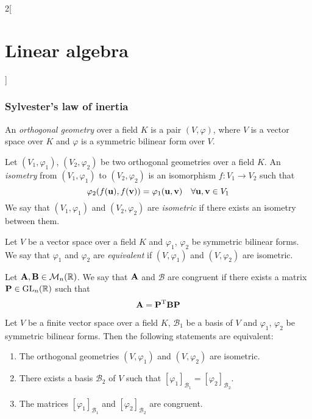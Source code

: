 \documentclass[../../../main_math.tex]{subfiles}
\begin{document}
\begin{multicols}{2}[\section{Linear algebra}]
  \subsubsection{Sylvester's law of inertia}
  \begin{definition}
    An \emph{orthogonal geometry} over a field $K$ is a pair $(V,\varphi)$, where $V$ is a vector space over $K$ and $\varphi$ is a symmetric bilinear form over $V$.
  \end{definition}
  \begin{definition}\label{LA:isometry}
    Let $(V_1,\varphi_1)$, $(V_2,\varphi_2)$ be two orthogonal geometries over a field $K$. An \emph{isometry} from $(V_1,\varphi_1)$ to $(V_2,\varphi_2)$ is an isomorphism $f:V_1\rightarrow V_2$ such that $$\varphi_2(f(\boldsymbol{\mathrm{u}}),f(\boldsymbol{\mathrm{v}}))=\varphi_1(\boldsymbol{\mathrm{u}},\boldsymbol{\mathrm{v}})\quad\forall\boldsymbol{\mathrm{u}},\boldsymbol{\mathrm{v}}\in V_1$$ We say that $(V_1,\varphi_1)$ and $(V_2,\varphi_2)$ are \emph{isometric} if there exists an isometry between them.
  \end{definition}
  \begin{definition}
    Let $V$ be a vector space over a field $K$ and $\varphi_1$, $\varphi_2$ be symmetric bilinear forms. We say that $\varphi_1$ and $\varphi_2$ are \emph{equivalent} if $(V,\varphi_1)$ and $(V,\varphi_2)$ are isometric.
  \end{definition}
  \begin{definition}
    Let $\boldsymbol{\mathrm{A}},\boldsymbol{\mathrm{B}}\in\mathcal{M}_n(\mathbb{R})$. We say that $\boldsymbol{\mathrm{A}}$ and $\mathcal{B}$ are congruent if there exists a matrix $\boldsymbol{\mathrm{P}}\in\mathrm{GL}_n(\mathbb{R})$ such that $$\boldsymbol{\mathrm{A}}={\boldsymbol{\mathrm{P}}}^{\mathrm{T}}\boldsymbol{\mathrm{B}}\boldsymbol{\mathrm{P}}$$
  \end{definition}
  \begin{proposition}
    Let $V$ be a finite vector space over a field $K$, $\mathcal{B}_1$ be a basis of $V$ and $\varphi_1$, $\varphi_2$ be symmetric bilinear forms. Then the following statements are equivalent:
    \begin{enumerate}
      \item The orthogonal geometries $(V,\varphi_1)$ and $(V,\varphi_2)$ are isometric.
      \item There exists a basis $\mathcal{B}_2$ of $V$ such that $[\varphi_1]_{\mathcal{B}_1}=[\varphi_2]_{\mathcal{B}_2}$.
      \item The matrices $[\varphi_1]_{\mathcal{B}_1}$ and $[\varphi_2]_{\mathcal{B}_2}$ are congruent.
    \end{enumerate}
  \end{proposition}
  \begin{theorem}

\end{theorem}
\end{multicols}
\end{document}
